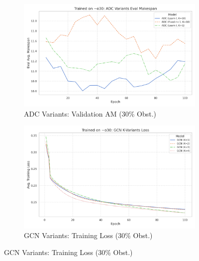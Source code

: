 \begin{figure}[htbp]
    \vspace{0.3cm}

    \begin{subfigure}[b]{0.48\textwidth}
        \centering
        \includegraphics[width=\textwidth]{trainplotbase/TRAINED_ON_30_OBS/training_curves_focused/condition_o30/adc_variants_eval_am.png} %
        \caption{ADC Variants: Validation AM (30\% Obst.)}
        \label{fig:adc_val_am_30obs}
    \end{subfigure}
    \hfill
    \begin{subfigure}[b]{0.48\textwidth}
        \centering
        \includegraphics[width=\textwidth]{trainplotbase/TRAINED_ON_30_OBS/training_curves_focused/condition_o30/gcn_variants_train_loss.png} %
        \caption{GCN Variants: Training Loss (30\% Obst.)}
        \label{fig:gcn_train_loss_30obs}
    \end{subfigure}

    \vspace{0.3cm}


\end{figure}
